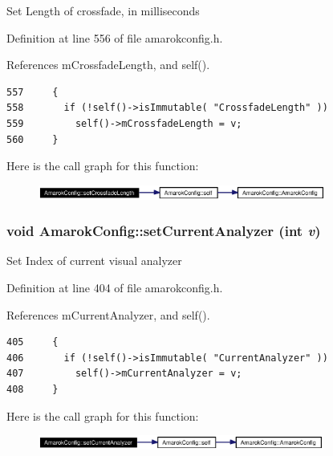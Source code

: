 Set Length of crossfade, in milliseconds 

Definition at line 556 of file amarokconfig.h.

References m\-Crossfade\-Length, and self().



\footnotesize\begin{verbatim}557     {
558       if (!self()->isImmutable( "CrossfadeLength" ))
559         self()->mCrossfadeLength = v;
560     }
\end{verbatim}\normalsize 


Here is the call graph for this function:\begin{figure}[H]
\begin{center}
\leavevmode
\includegraphics[width=268pt]{classAmarokConfig_AmarokConfige57_cgraph}
\end{center}
\end{figure}
\subsubsection{\setlength{\rightskip}{0pt plus 5cm}void Amarok\-Config::set\-Current\-Analyzer (int {\em v})\hspace{0.3cm}{\tt  [inline, static]}}\label{classAmarokConfig_AmarokConfige41}


Set Index of current visual analyzer 

Definition at line 404 of file amarokconfig.h.

References m\-Current\-Analyzer, and self().



\footnotesize\begin{verbatim}405     {
406       if (!self()->isImmutable( "CurrentAnalyzer" ))
407         self()->mCurrentAnalyzer = v;
408     }
\end{verbatim}\normalsize 


Here is the call graph for this function:\begin{figure}[H]
\begin{center}
\leavevmode
\includegraphics[width=266pt]{classAmarokConfig_AmarokConfige41_cgraph}
\end{center}
\end{figure}
